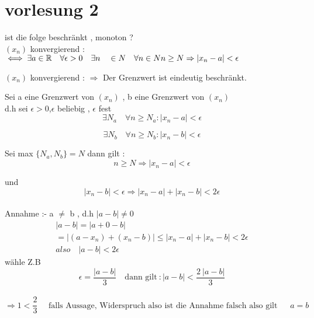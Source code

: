 \section{vorlesung 2}
\begin{text}
    ist die folge beschränkt , monoton ?\\

    $(x_n)$ konvergierend : $\iff \exists a \in\mathbb{R} \quad \forall \epsilon > 0 \quad \exists n \quad \in N \quad \forall n \in N \quad \\
    n \geq N \Rightarrow |x_n - a |< \epsilon $
\end{text}


\begin{theorem}

    $(x_n)$ konvergierend : $\Rightarrow$ Der Grenzwert ist eindeutig beschränkt.

\end{theorem}



\begin{beweis}
    Sei a eine Grenzwert von $(x_n)$ , b eine Grenzwert von $(x_n)$ \\
    d.h sei $\epsilon > 0$,$\epsilon$ beliebig , $\epsilon$ fest \\


    \begin{equation}
        \exists  N_a \quad \forall n \geq N_a : |x_n-a|< \epsilon
    \end{equation}
    

    \begin{equation}
        \exists  N_b \quad \forall n \geq N_b : |x_n-b|< \epsilon
    \end{equation}

    Sei max $\{N_a,N_b\}=N$
    dann gilt : \\
    \begin{equation}
        n \geq N \Rightarrow |x_n - a| < \epsilon
    \end{equation}
    
    und \begin{equation}
            |x_n -b| < \epsilon \Rightarrow |x_n -a|+|x_n - b|< 2\epsilon
    \end{equation}\\
Annahme :- a $\neq$ b , d.h $|a-b|\neq 0 $
    \begin{gather*}
    |a-b|=|a+0-b|\\
    =|(a-x_n)+(x_n-b)| \leq |x_n - a|+|x_n-b|< 2 \epsilon \\
    also \quad |a - b|< 2 \epsilon
\end{gather*}
  wähle Z.B  \[\epsilon = \frac{|a-b|}{3}
        \quad
         \text{dann gilt}\ :|a-b|< \frac{2 \ |a-b|}{3}\]\\
 
        \[ \Rightarrow 1 < \frac{2}{3} \quad  \text{ falls  Aussage, Widerspruch  also  ist  die  Annahme  falsch  also  gilt }\ \quad a=b\]
\end{beweis}
\newpage


